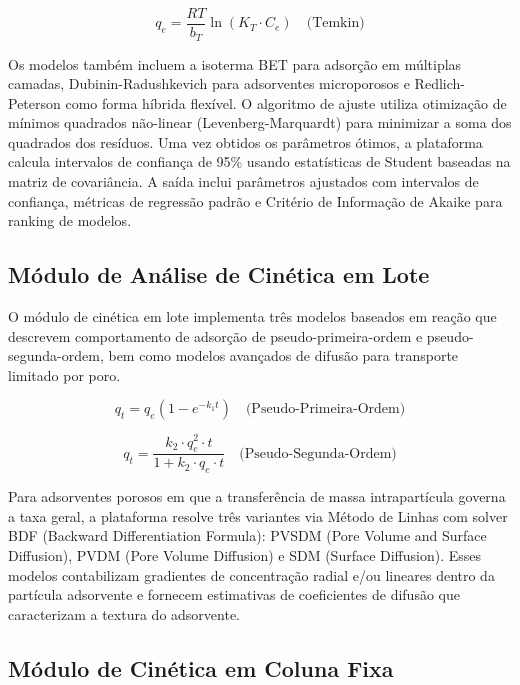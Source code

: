 \documentclass[openany, a4paper, twoside]{article}
\begin{document}
\begin{equation}
q_e = \frac{RT}{b_T} \ln(K_T \cdot C_e) \quad \text{(Temkin)}
\label{eq:temkin}
\end{equation}

Os modelos também incluem a isoterma BET para adsorção em múltiplas camadas, Dubinin-Radushkevich para adsorventes microporosos e Redlich-Peterson como forma híbrida flexível. O algoritmo de ajuste utiliza otimização de mínimos quadrados não-linear (Levenberg-Marquardt) para minimizar a soma dos quadrados dos resíduos. Uma vez obtidos os parâmetros ótimos, a plataforma calcula intervalos de confiança de 95\% usando estatísticas de Student baseadas na matriz de covariância. A saída inclui parâmetros ajustados com intervalos de confiança, métricas de regressão padrão e Critério de Informação de Akaike para ranking de modelos.

\subsection{Módulo de Análise de Cinética em Lote}

O módulo de cinética em lote implementa três modelos baseados em reação que descrevem comportamento de adsorção de pseudo-primeira-ordem e pseudo-segunda-ordem, bem como modelos avançados de difusão para transporte limitado por poro.

\begin{equation}
q_t = q_e (1 - e^{-k_1 t}) \quad \text{(Pseudo-Primeira-Ordem)}
\label{eq:pfo}
\end{equation}

\begin{equation}
q_t = \frac{k_2 \cdot q_e^2 \cdot t}{1 + k_2 \cdot q_e \cdot t} \quad \text{(Pseudo-Segunda-Ordem)}
\label{eq:pso}
\end{equation}

Para adsorventes porosos em que a transferência de massa intrapartícula governa a taxa geral, a plataforma resolve três variantes via Método de Linhas com solver BDF (Backward Differentiation Formula): PVSDM (Pore Volume and Surface Diffusion), PVDM (Pore Volume Diffusion) e SDM (Surface Diffusion). Esses modelos contabilizam gradientes de concentração radial e/ou lineares dentro da partícula adsorvente e fornecem estimativas de coeficientes de difusão que caracterizam a textura do adsorvente.

\subsection{Módulo de Cinética em Coluna Fixa}
\end{document}
